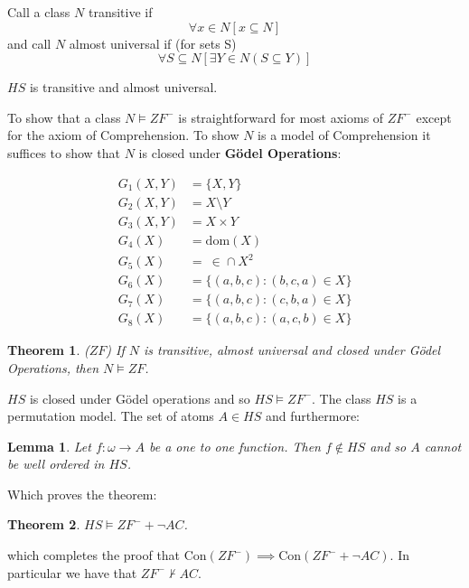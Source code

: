 \documentclass[12pt]{article}
\newcommand{\w}{\omega}
\newcommand{\nproves}{\nvdash}
\renewcommand{\subset}{\subseteq}
\newtheorem*{thm}{Theorem}
\newtheorem*{lem}{Lemma}
\begin{document}
Call a class $N$ transitive if
\[
\forall x \in N [ x \subset N]
\]
and call $N$ almost universal if (for sets S)
\[
\forall S \subset N [ \exists Y \in N (S \subset Y) ]
\]
                                                                                
$HS$ is transitive and almost universal.
                                                                                
To show that a class $N \models ZF^-$ is straightforward for most axioms of $ZF^-$ except for the axiom of Comprehension.  To show $N$ is a model of Comprehension it suffices to show that $N$ is closed under \textbf{G\"odel Operations}:
                                                                                
\begin{align*}
G_1(X,Y) &= \{X,Y\} \\
G_2(X,Y) &= X \setminus Y \\
G_3(X,Y) &= X \times Y \\
G_4(X) &= \text{dom}(X)\\
G_5(X) &= \ \in \!\cap X^2 \\
G_6(X) &= \{(a,b,c) : (b,c,a) \in X \}\\
G_7(X) &= \{(a,b,c) : (c,b,a) \in X \}\\
G_8(X) &= \{(a,b,c) : (a,c,b) \in X \}
\end{align*}
                                                                                
\begin{thm} ($ZF$)  If $N$ is transitive, almost universal and closed under G\"odel Operations, then $N \models ZF$.
\end{thm}
                                                                                
$HS$ is closed under G\"odel operations and so $HS \models ZF^-$.  The class $HS$ is a permutation model.  The set of atoms $A \in HS$ and furthermore:
                                                                                
\begin{lem} Let $f : \w \rightarrow A$ be a one to one function.  Then $f \notin HS$ and so $A$ cannot be well ordered in $HS$.
\end{lem}
                                                                                
Which proves the   theorem:                                                                                
                                                                                
\begin{thm}
$HS \models ZF^- + \neg AC$.
\end{thm}
                                                                                
which completes the proof that $\text{Con}(ZF^-) \implies \text{Con}(ZF^- + \neg AC)$.  In particular we have that $ZF^- \nproves AC$.
\end{document}
